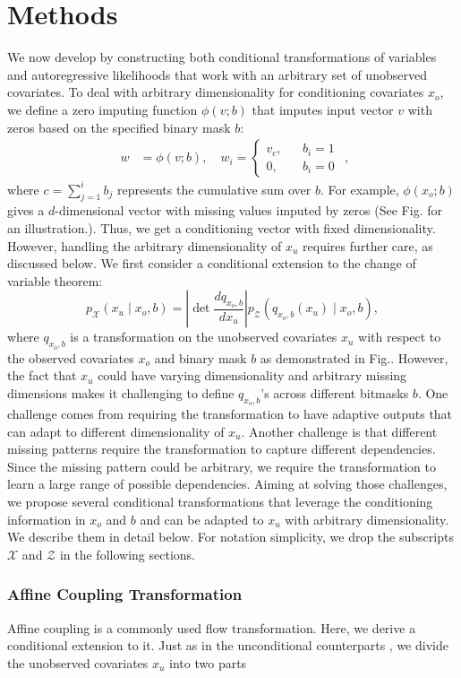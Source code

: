 \documentclass[letterpaper]{article} %
\begin{document}
\section{Methods}
We now develop by constructing both conditional transformations of variables and autoregressive likelihoods that work with an arbitrary set of unobserved covariates.
To deal with arbitrary dimensionality for conditioning covariates $x_o$, we define a zero imputing function $\phi(v;b)$ that imputes input vector $v$ with zeros based on the specified binary mask $b$:
\begin{equation}
\begin{split}
    w &= \phi(v;b),\quad
    w_i = \left\{
            \begin{array}{rcl}
            v_c, & &b_i = 1\\
            0,   & &b_i = 0
            \end{array}
          \right.
\end{split},
\end{equation}
where $c=\sum_{j=1}^{i}b_j$ represents the cumulative sum over $b$.
For example, $\phi(x_o;b)$ gives a $d$-dimensional vector with missing values imputed by zeros (See Fig. for an illustration.). Thus, we get a conditioning vector with fixed dimensionality.
However, handling the arbitrary dimensionality of $x_u$ requires further care, as discussed below.
We first consider a conditional extension to the change of variable theorem:
\begin{equation}
    p_{\mathcal{X}}(x_u \mid x_o, b) = \left| \det \frac{dq_{x_o,b}}{dx_u} \right| p_{\mathcal{Z}}(q_{x_o,b}(x_u) \mid x_o,b),
\end{equation}
where $q_{x_o, b}$ is a transformation on the unobserved covariates $x_u$ with respect to the observed covariates $x_o$ and binary mask $b$ as demonstrated in Fig..
However, the fact that $x_u$ could have varying dimensionality and arbitrary missing dimensions makes it challenging to define $q_{x_o, b}$'s across different bitmasks $b$.
One challenge comes from requiring the transformation to have adaptive outputs that can adapt to different dimensionality of $x_u$. Another challenge is that different missing patterns require the transformation to capture different dependencies. Since the missing pattern could be arbitrary, we require the transformation to learn a large range of possible dependencies.
Aiming at solving those challenges, we propose several conditional transformations that leverage the conditioning information in $x_o$ and $b$ and can be adapted to $x_u$ with arbitrary dimensionality. We describe them in detail below.
For notation simplicity, we drop the subscripts $\mathcal{X}$ and $\mathcal{Z}$ in the following sections.
\subsubsection{Affine Coupling Transformation}
Affine coupling is a commonly used flow transformation. Here, we derive a conditional extension to it.
Just as in the unconditional counterparts , we divide the unobserved covariates $x_u$ into two parts
\end{document}
